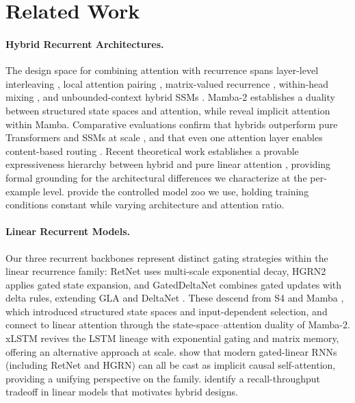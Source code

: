 \section{Related Work}

\paragraph{Hybrid Recurrent Architectures.}
The design space for combining attention with recurrence spans layer-level interleaving \citep[Jamba;][]{lieber2024jamba}, local attention pairing \citep[Griffin, RecurrentGemma;][]{de2024griffin,botev2024recurrentgemma}, matrix-valued recurrence \citep[RWKV-6;][]{peng2024eagle}, within-head mixing \citep[Hymba;][]{dong2024hymba}, and unbounded-context hybrid SSMs \citep[Samba;][]{ren2024samba}. Mamba-2 \citep{dao2024mamba2} establishes a duality between structured state spaces and attention, while \citet{ali2025hidden} reveal implicit attention within Mamba. Comparative evaluations confirm that hybrids outperform pure Transformers and SSMs at scale \citep{waleffe2024empirical}, and that even one attention layer enables content-based routing \citep{basu2026routing}. Recent theoretical work establishes a provable expressiveness hierarchy between hybrid and pure linear attention \citep{ye2026provable}, providing formal grounding for the architectural differences we characterize at the per-example level. \citet{wang2025hybrid} provide the controlled model zoo we use, holding training conditions constant while varying architecture and attention ratio.

\paragraph{Linear Recurrent Models.}
Our three recurrent backbones represent distinct gating strategies within the linear recurrence family: RetNet \citep{sun2023retnet} uses multi-scale exponential decay, HGRN2 \citep{qin2024hgrn2} applies gated state expansion, and GatedDeltaNet \citep{yang2024gateddeltanet} combines gated updates with delta rules, extending GLA \citep{yang2024gla} and DeltaNet \citep{yang2024deltanet}. These descend from S4 \citep{gu2022s4} and Mamba \citep{gu2024mamba}, which introduced structured state spaces and input-dependent selection, and connect to linear attention \citep{katharopoulos2020transformers} through the state-space--attention duality of Mamba-2. xLSTM \citep{beck2024xlstm} revives the LSTM lineage with exponential gating and matrix memory, offering an alternative approach at scale. \citet{zimerman2025unified} show that modern gated-linear RNNs (including RetNet and HGRN) can all be cast as implicit causal self-attention, providing a unifying perspective on the family. \citet{arora2024based} identify a recall-throughput tradeoff in linear models that motivates hybrid designs.

